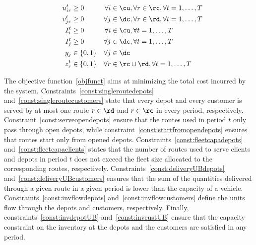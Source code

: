 \documentclass[a4paper,10pt]{article}
\begin{document}
\begin{linenumbers}
\begin{alignat}{3}
                 &&u^t_{ir}			&\geq 0 															&\forall i &\in \cu, \forall r\in \rc,\forall t=1,\ldots, T\label{const:upos}	\\
                 &&v^t_{jr}			&\geq 0 															&\forall j &\in \dc, \forall r\in \rd,\forall t=1,\ldots, T\label{const:vpos}	\\
                 &&I^t_{i}			&\geq 0 															&\forall i &\in \cu, \forall t=1,\ldots, T\label{const:invCpos}	\\
                 &&I^t_{j}			&\geq 0 															&\forall j &\in \dc, \forall t=1,\ldots, T\label{const:invDpos}	\\
                 &&y_{j}					& \in \{0,1\} 														&\forall j&\in \dc\label{const:ybool}\\	
                 &&z^t_r					&\in \{0,1\} 														&\forall r&\in \rc\cup\rd, \forall t=1,\ldots,T\label{const:zbool}
\end{alignat}

The objective function~\eqref{objfunct} aims at minimizing the total cost incurred by the system. 
Constraints~\eqref{const:singleroutedepots} and~\eqref{const:singleroutecustomers} state that every depot and every customer is served by at most one route $r\in\rd$ and $r\in\rc$ in every period, respectively. 
Constraint~\eqref{const:serveopendepots} ensure that the routes used in period $t$ only pass through open depots, while constraint~\eqref{const:startfromopendepots} ensures that routes start only from opened depots. 
Constraints~\eqref{const:fleetcapadepots} and~\eqref{const:fleetcapaclients} states that the number of routes used to serve clients and depots in period $t$ does not exceed the fleet size allocated to the corresponding routes, respectively.
Constraints~\eqref{const:deliveryUBdepots} and~\eqref{const:deliveryUBcustomers} ensures that the sum of the quantities delivered through a given route in a given period is lower than the capacity of a vehicle. 
Constraints~\eqref{const:invflowdepots} and~\eqref{const:invflowcustomers} define the units flow through the depots and customers, respectively.
Finally, constraints~\eqref{const:invdepotUB} and~\eqref{const:invcustUB} ensure that the capacity constraint on the inventory at the depots and the customers are satisfied in any period. 


\end{linenumbers}
\end{document}
